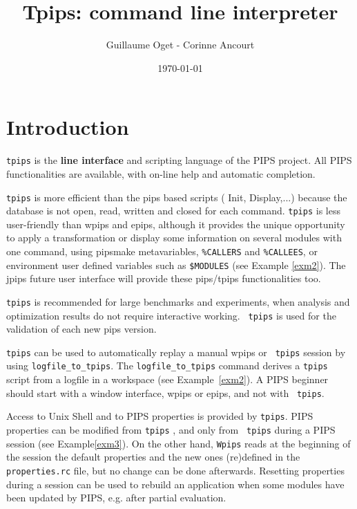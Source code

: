 \documentclass[a4paper,12pt]{article}
\title{Tpips: command line interpreter}
\author{Guillaume Oget - Corinne Ancourt}
\date{\today}
\begin{document}
\setlength{\parindent}{0in}

\maketitle


\tableofcontents

\section{Introduction}


{\tt tpips} is the {\bf line interface} and scripting language of the
PIPS project. All PIPS functionalities are available, with
on-line help and automatic completion.

{\tt tpips} is more efficient than the pips based scripts ( Init,
Display,...) because the database is not open, read, written and closed
for each command. {\tt tpips} is less user-friendly than wpips and epips,
although it provides the unique opportunity to apply a transformation or
display some information on several modules with one command, using
pipsmake metavariables, 
\verb+%CALLERS+ and  \verb+%CALLEES+,  or environment  user defined variables such
as \verb+$MODULES+ (see Example \ref{exm2}). The jpips future user
interface will provide these pips/tpips functionalities too.

{\tt tpips} is recommended for large benchmarks and experiments, when
analysis and optimization results do not require interactive working. {\tt
  tpips} is used for the validation of each new pips version.

{\tt tpips} can be used to automatically replay a manual wpips or {\tt
  tpips} session by using \verb+logfile_to_tpips+. The
\verb+logfile_to_tpips+ command derives a {\tt tpips} script
from a logfile in a workspace (see Example~\ref{exm2}). A PIPS beginner
should start with a window interface, wpips or epips, and not with {\tt
  tpips}.


Access to Unix Shell and to PIPS properties is provided by {\tt tpips}.
PIPS properties can be modified from {\tt tpips} , and only from {\tt
  tpips} during a PIPS session (see Example\ref{exm3}). On the other hand,
{\tt Wpips} reads at the
beginning of the session the default properties and the new ones
(re)defined in the {\tt properties.rc} file, but no change can be done
afterwards.  Resetting properties during a session can be used to rebuild
an application when some modules have been updated by PIPS, e.g. after
partial evaluation.
\end{document}
